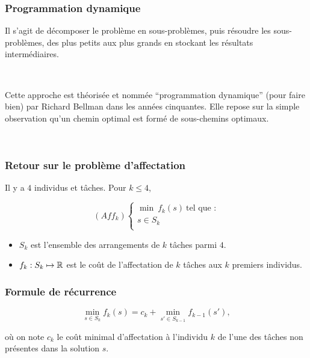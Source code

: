 \documentclass{beamer}
\newcommand{\R}{{\ensuremath\mathbb{R}}}
\begin{document}
\begin{frame}
  \frametitle{Programmation dynamique}

  Il s'agit de décomposer le problème en sous-problèmes, puis résoudre les sous-problèmes,
  des plus petits aux plus grands en stockant les résultats intermédiaires.

  ~
  
  Cette approche est théorisée et nommée ``programmation dynamique'' (pour faire bien)
  par Richard Bellman dans les années cinquantes. Elle repose sur la simple observation
  qu'un chemin optimal est formé de sous-chemins optimaux.

  ~
  
\end{frame}
  
\begin{frame}
  \frametitle{Retour sur le problème d'affectation}

  Il y a $4$ individus et tâches. Pour $k \leq 4$, 

  \[
  (Aff_k) \left\{
  \begin{array}{c}
    \min \ f_k(s) \ \text{tel que :} \\
    s \in S_k \\
  \end{array}
  \right.
  \]

  \begin{itemize}
  \item $S_k$ est l'ensemble des arrangements de $k$ tâches parmi $4$.  
  \item $f_k : S_k \mapsto \R$ est le coût de l'affectation
    de $k$ tâches aux $k$ premiers individus.   
  \end{itemize}

\end{frame}

\begin{frame}
  \frametitle{Formule de récurrence}

  \[ \min_{s \in S_k} f_k(s) = c_k + \min_{s' \in S_{k-1}} f_{k-1}(s'), \]

  où on note $c_k$ le coût minimal d'affectation à l'individu $k$ de
  l'une des tâches non présentes dans la solution $s$. 
  
\end{frame}
\end{document}
